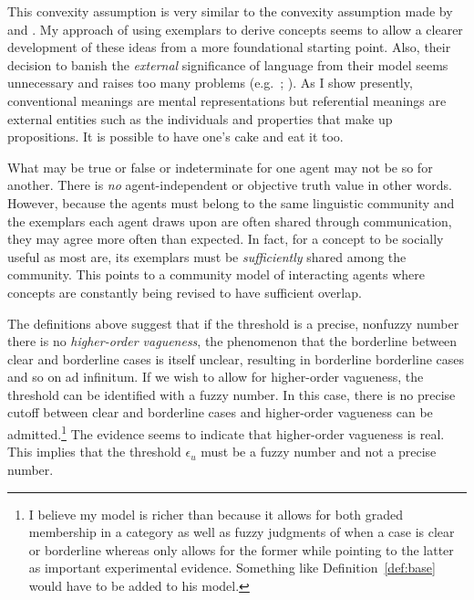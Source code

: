 This convexity assumption is very similar to the convexity assumption made by \citet{gardenfors:cs} and \citet{wg:scsmm}. My approach of using exemplars to derive concepts seems to allow a clearer development of these ideas from a more foundational starting point. Also, their decision to banish the \emph{external} significance of language from their model seems unnecessary and raises too many problems (e.g.\ \citealt{putnam:mm}; \citealt[28--31]{bp:sa}). As I show presently, conventional meanings are mental representations but referential meanings are external entities such as the individuals and properties that make up propositions. It is possible to have one's cake and eat it too.

What may be true or false or indeterminate for one agent may not be so for another. There is \emph{no} agent-independent or objective truth value in other words. However, because the agents must belong to the same linguistic community and the exemplars each agent draws upon are often shared through communication, they may agree more often than expected. In fact, for a concept to be socially useful as most are, its exemplars must be \emph{sufficiently} shared among the community. This points to a community model of interacting agents where concepts are constantly being revised to have sufficient overlap.

The definitions above suggest that if the threshold is a precise, nonfuzzy number there is no \emph{higher-order vagueness}, the phenomenon that the borderline between clear and borderline cases is itself unclear, resulting in borderline borderline cases and so on ad infinitum. If we wish to allow for higher-order vagueness, the threshold can be identified with a fuzzy number. In this case, there is no precise cutoff between clear and borderline cases and higher-order vagueness can be admitted.\footnote{I believe my model is richer than  because it allows for both graded membership in a category as well as fuzzy judgments of when a case is clear or borderline whereas \citet[377]{hampton:tgmv} only allows for the former while pointing to the latter as important experimental evidence. Something like Definition~\ref{def:base} would have to be added to his model.} The evidence seems to indicate that higher-order vagueness is real. This implies that the threshold $\epsilon_u$ must be a fuzzy number and not a precise number. 




